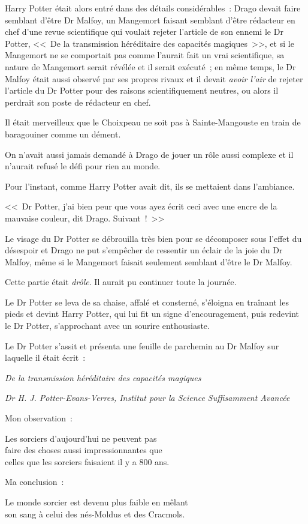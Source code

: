 Harry Potter était alors entré dans des détails considérables~: Drago devait faire semblant d'être Dr Malfoy, un Mangemort faisant semblant d'être rédacteur en chef d'une revue scientifique qui voulait rejeter l'article de son ennemi le Dr Potter, <<~De la transmission héréditaire des capacités magiques~>>, et si le Mangemort ne se comportait pas comme l'aurait fait un vrai scientifique, sa nature de Mangemort serait révélée et il serait exécuté~; en même temps, le Dr Malfoy était aussi observé par ses propres rivaux et il devait \emph{avoir l'air} de rejeter l'article du Dr Potter pour des raisons scientifiquement neutres, ou alors il perdrait son poste de rédacteur en chef.

Il était merveilleux que le Choixpeau ne soit pas à Sainte-Mangouste en train de baragouiner comme un dément.

On n'avait aussi jamais demandé à Drago de jouer un rôle aussi complexe et il n'aurait refusé le défi pour rien au monde.

Pour l'instant, comme Harry Potter avait dit, ils se mettaient dans l'ambiance.

<<~Dr Potter, j'ai bien peur que vous ayez écrit ceci avec une encre de la mauvaise couleur, dit Drago. Suivant~!~>>

Le visage du Dr Potter se débrouilla très bien pour se décomposer sous l'effet du désespoir et Drago ne put s'empêcher de ressentir un éclair de la joie du Dr Malfoy, même si le Mangemort faisait seulement semblant d'être le Dr Malfoy.

Cette partie était \emph{drôle}. Il aurait pu continuer toute la journée.

Le Dr Potter se leva de sa chaise, affalé et consterné, s'éloigna en traînant les pieds et devint Harry Potter, qui lui fit un signe d'encouragement, puis redevint le Dr Potter, s'approchant avec un sourire enthousiaste.

Le Dr Potter s'assit et présenta une feuille de parchemin au Dr Malfoy sur laquelle il était écrit~:
\begin{center}
\emph{De la transmission héréditaire des capacités magiques}

\emph{Dr H. J. Potter-Evans-Verres, Institut pour la Science Suffisamment Avancée} \end{center}

\begin{writtenNote}
Mon observation~:

Les sorciers d'aujourd'hui ne peuvent pas\\
faire des choses aussi impressionnantes que\\
celles que les sorciers faisaient il y a 800 ans.

Ma conclusion~:

Le monde sorcier est devenu plus faible en mêlant\\
son sang à celui des nés-Moldus et des Cracmols.
\end{writtenNote}

